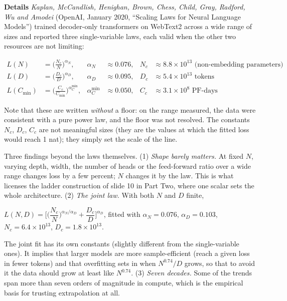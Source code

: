 \documentclass[11pt,letterpaper]{article}
\newcommand{\para}[1]{\medskip\noindent\textbf{#1}\quad}
\newenvironment{formulas}{\begin{tcolorbox}[formulabox]}{\end{tcolorbox}}
\begin{document}
\para{Details} \emph{Kaplan, McCandlish, Henighan, Brown, Chess, Child, Gray, Radford, Wu and Amodei} (OpenAI, January 2020, ``Scaling Laws for Neural Language Models'') trained decoder-only transformers on WebText2 across a wide range of sizes and reported three single-variable laws, each valid when the other two resources are not limiting:
\begin{formulas}
\begin{align*}
L(N) &= \Big(\frac{N_c}{N}\Big)^{\alpha_N}, & \alpha_N&\approx0.076, & N_c&\approx8.8\times10^{13} \text{ (non-embedding parameters)}\\
L(D) &= \Big(\frac{D_c}{D}\Big)^{\alpha_D}, & \alpha_D&\approx0.095, & D_c&\approx5.4\times10^{13} \text{ tokens}\\
L(C_{\min}) &= \Big(\frac{C_c}{C_{\min}}\Big)^{\alpha_C^{\min}}, & \alpha_C^{\min}&\approx0.050, & C_c&\approx3.1\times10^{8} \text{ PF-days}
\end{align*}
\end{formulas}
Note that these are written \emph{without} a floor: on the range measured, the data were consistent with a pure power law, and the floor was not resolved. The constants $N_c$, $D_c$, $C_c$ are not meaningful sizes (they are the values at which the fitted loss would reach 1 nat); they simply set the scale of the line.

Three findings beyond the laws themselves. (1) \emph{Shape barely matters.} At fixed $N$, varying depth, width, the number of heads or the feed-forward ratio over a wide range changes loss by a few percent; $N$ changes it by the law. This is what licenses the ladder construction of slide 10 in Part Two, where one scalar sets the whole architecture. (2) \emph{The joint law.} With both $N$ and $D$ finite,
\begin{formulas}
$L(N,D)=\Big[\Big(\dfrac{N_c}{N}\Big)^{\alpha_N/\alpha_D}+\dfrac{D_c}{D}\Big]^{\alpha_D}$, \quad fitted with $\alpha_N=0.076$, $\alpha_D=0.103$, $N_c=6.4\times10^{13}$, $D_c=1.8\times10^{13}$.
\end{formulas}
The joint fit has its own constants (slightly different from the single-variable ones). It implies that larger models are more sample-efficient (reach a given loss in fewer tokens) and that overfitting sets in when $N^{0.74}/D$ grows, so that to avoid it the data should grow at least like $N^{0.74}$. (3) \emph{Seven decades.} Some of the trends span more than seven orders of magnitude in compute, which is the empirical basis for trusting extrapolation at all.
\end{document}
